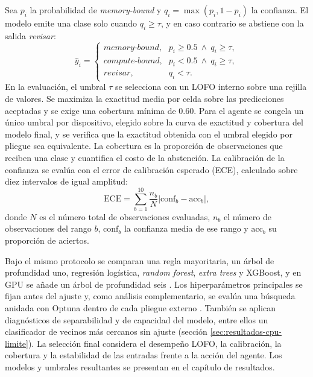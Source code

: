 Sea $p_i$ la probabilidad de \textit{memory-bound} y $q_i=\max(p_i,1-p_i)$ la confianza. El modelo emite una clase solo cuando $q_i\geq\tau$, y en caso contrario se abstiene con la salida \textit{revisar}:
\begin{equation}
\widehat{y}_i=\begin{cases}
\textit{memory-bound}, & p_i\geq 0.5\ \land\ q_i\geq\tau,\\
\textit{compute-bound}, & p_i<0.5\ \land\ q_i\geq\tau,\\
\textit{revisar}, & q_i<\tau.
\end{cases}
\label{eq:met-selectiva}
\end{equation}
En la evaluación, el umbral $\tau$ se selecciona con un LOFO interno sobre una rejilla de valores. Se maximiza la exactitud media por celda sobre las predicciones aceptadas y se exige una cobertura mínima de 0.60. Para el agente se congela un único umbral por dispositivo, elegido sobre la curva de exactitud y cobertura del modelo final, y se verifica que la exactitud obtenida con el umbral elegido por pliegue sea equivalente. La cobertura es la proporción de observaciones que reciben una clase y cuantifica el costo de la abstención. La calibración de la confianza se evalúa con el error de calibración esperado (ECE), calculado sobre diez intervalos de igual amplitud:
\begin{equation}
\mathrm{ECE} = \sum_{b=1}^{10} \frac{n_b}{N}\left|\mathrm{conf}_b - \mathrm{acc}_b\right|,
\label{eq:met-ece}
\end{equation}
donde $N$ es el número total de observaciones evaluadas, $n_b$ el número de observaciones del rango $b$, $\mathrm{conf}_b$ la confianza media de ese rango y $\mathrm{acc}_b$ su proporción de aciertos.

Bajo el mismo protocolo se comparan una regla mayoritaria, un árbol de profundidad uno, regresión logística, \textit{random forest}, \textit{extra trees} y XGBoost, y en GPU se añade un árbol de profundidad seis \cite{Demsar2006}. Los hiperparámetros principales se fijan antes del ajuste y, como análisis complementario, se evalúa una búsqueda anidada con Optuna dentro de cada pliegue externo \cite{Cawley2010}. También se aplican diagnósticos de separabilidad y de capacidad del modelo, entre ellos un clasificador de vecinos más cercanos sin ajuste (sección \ref{sec:resultados-cpu-limite}). La selección final considera el desempeño LOFO, la calibración, la cobertura y la estabilidad de las entradas frente a la acción del agente. Los modelos y umbrales resultantes se presentan en el capítulo de resultados.

